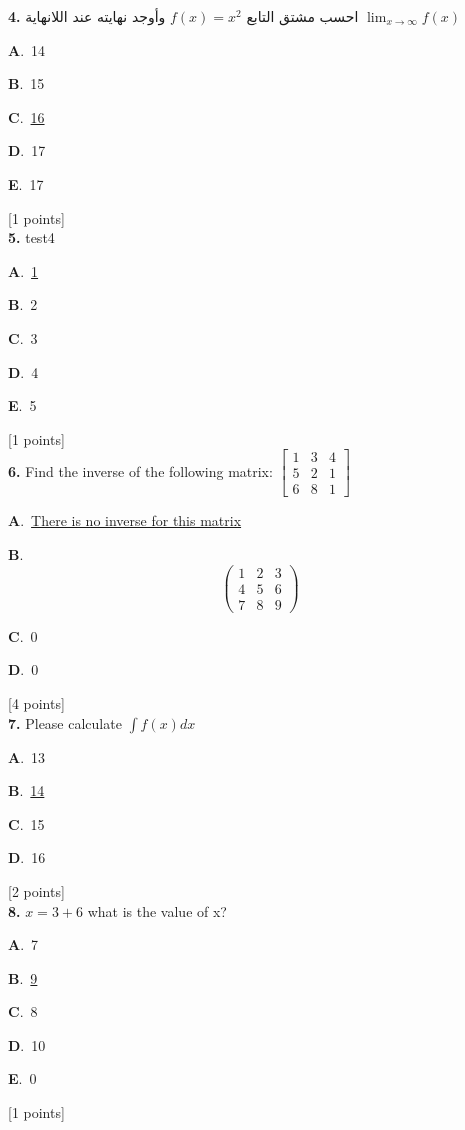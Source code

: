 \documentclass[12pt]{article}
\newcommand{\choice}[3]{%
  \noindent\textbf{#1}.~#2\hfill#3\par\vspace{0.25em}
}
\begin{document}
\noindent \textbf{\textenglish{4.}} {\textarabic{احسب مشتق التابع }}\( f(x) = x^2\){\textarabic{ وأوجد نهايته عند اللانهاية }}\(\lim_{x \to \infty}f(x)\)

\noindent\choice{A}{{\textenglish{14}}}{}
\noindent\choice{B}{{\textenglish{15}}}{}
\noindent\choice{C}{\underline{{\textenglish{16}}}}{}
\noindent\choice{D}{{\textenglish{17}}}{}
\noindent\choice{E}{{\textenglish{17}}}{}
\hfill {\textenglish{[1 points]}}\\[0.5em]

\noindent \textbf{\textenglish{5.}} {\textenglish{test4}}

\noindent\choice{A}{\underline{{\textenglish{1}}}}{}
\noindent\choice{B}{{\textenglish{2}}}{}
\noindent\choice{C}{{\textenglish{3}}}{}
\noindent\choice{D}{{\textenglish{4}}}{}
\noindent\choice{E}{{\textenglish{5}}}{}
\hfill {\textenglish{[1 points]}}\\[0.5em]

\noindent \textbf{\textenglish{6.}} {\textenglish{Find the inverse of the following matrix: }}\(\begin{bmatrix} 1 & 3 & 4 \\ 5 & 2 & 1 \\ 6 & 8 & 1 \end{bmatrix}\)

\noindent\choice{A}{\underline{{\textenglish{There is no inverse for this matrix}}}}{}
\noindent\choice{B}{\[\begin{pmatrix} 1 & 2 & 3 \\ 4 & 5 & 6 \\ 7 & 8 & 9  \end{pmatrix}\]}{}
\noindent\choice{C}{{\textenglish{0}}}{}
\noindent\choice{D}{{\textenglish{0}}}{}
\hfill {\textenglish{[4 points]}}\\[0.5em]

\noindent \textbf{\textenglish{7.}} {\textenglish{Please calculate }}\(\int f(x)dx\)

\noindent\choice{A}{{\textenglish{13}}}{}
\noindent\choice{B}{\underline{{\textenglish{14}}}}{}
\noindent\choice{C}{{\textenglish{15}}}{}
\noindent\choice{D}{{\textenglish{16}}}{}
\hfill {\textenglish{[2 points]}}\\[0.5em]

\noindent \textbf{\textenglish{8.}} \(x=3+6 \){\textenglish{ what is the value of x?}}

\noindent\choice{A}{{\textenglish{7}}}{}
\noindent\choice{B}{\underline{{\textenglish{9}}}}{}
\noindent\choice{C}{{\textenglish{8}}}{}
\noindent\choice{D}{{\textenglish{10}}}{}
\noindent\choice{E}{{\textenglish{0}}}{}
\hfill {\textenglish{[1 points]}}\\[0.5em]
\end{document}
